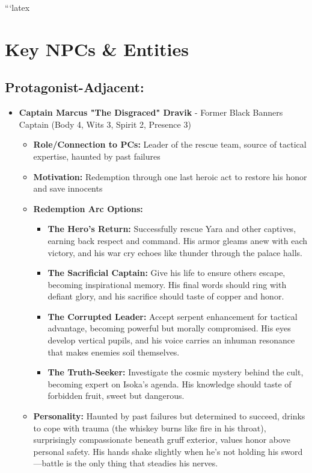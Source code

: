 \documentclass[11pt]{article}
\begin{document}
```latex
\section{Key NPCs \& Entities}

\subsection{Protagonist-Adjacent:}
\begin{itemize}
\item \textbf{Captain Marcus "The Disgraced" Dravik} - Former Black Banners Captain (Body 4, Wits 3, Spirit 2, Presence 3)
  \begin{itemize}
  \item \textbf{Role/Connection to PCs:} Leader of the rescue team, source of tactical expertise, haunted by past failures
  \item \textbf{Motivation:} Redemption through one last heroic act to restore his honor and save innocents
  \item \textbf{Redemption Arc Options:}
    \begin{itemize}
    \item \textbf{The Hero's Return:} Successfully rescue Yara and other captives, earning back respect and command. His armor gleams anew with each victory, and his war cry echoes like thunder through the palace halls.
    \item \textbf{The Sacrificial Captain:} Give his life to ensure others escape, becoming inspirational memory. His final words should ring with defiant glory, and his sacrifice should taste of copper and honor.
    \item \textbf{The Corrupted Leader:} Accept serpent enhancement for tactical advantage, becoming powerful but morally compromised. His eyes develop vertical pupils, and his voice carries an inhuman resonance that makes enemies soil themselves.
    \item \textbf{The Truth-Seeker:} Investigate the cosmic mystery behind the cult, becoming expert on Isoka's agenda. His knowledge should taste of forbidden fruit, sweet but dangerous.
    \end{itemize}
  \item \textbf{Personality:} Haunted by past failures but determined to succeed, drinks to cope with trauma (the whiskey burns like fire in his throat), surprisingly compassionate beneath gruff exterior, values honor above personal safety. His hands shake slightly when he's not holding his sword—battle is the only thing that steadies his nerves.

\end{itemize}
\end{itemize}
\end{document}
